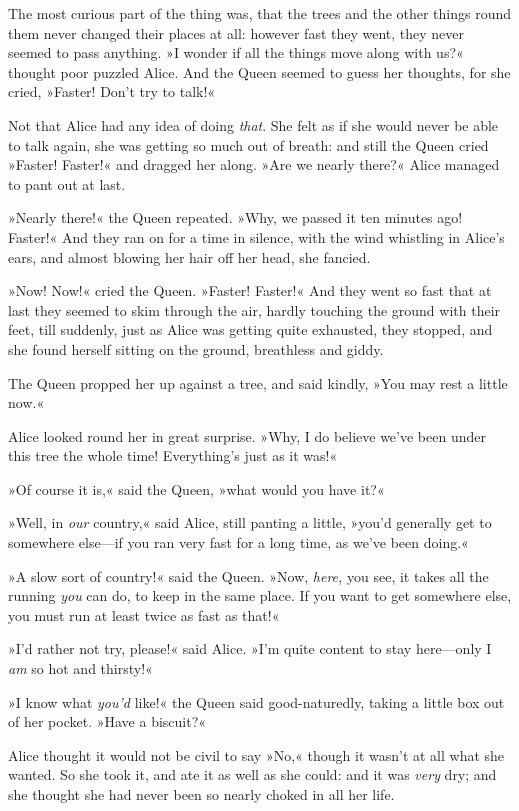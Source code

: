 The most curious part of the thing was, that the trees and the other things round them never changed their places at all: however fast they went, they never seemed to pass anything. »I wonder if all the things move along with us?« thought poor puzzled Alice. And the Queen seemed to guess her thoughts, for she cried, »Faster! Don't try to talk!«

Not that Alice had any idea of doing \textit{that}. She felt as if she would never be able to talk again, she was getting so much out of breath: and still the Queen cried »Faster! Faster!« and dragged her along. »Are we nearly there?« Alice managed to pant out at last.

»Nearly there!« the Queen repeated. »Why, we passed it ten minutes ago! Faster!« And they ran on for a time in silence, with the wind whistling in Alice's ears, and almost blowing her hair off her head, she fancied.

»Now! Now!« cried the Queen. »Faster! Faster!« And they went so fast that at last they seemed to skim through the air, hardly touching the ground with their feet, till suddenly, just as Alice was getting quite exhausted, they stopped, and she found herself sitting on the ground, breathless and giddy.

\label{black1}
The Queen propped her up against a tree, and said kindly, »You may rest a little now.«

Alice looked round her in great surprise. »Why, I do believe we've been under this tree the whole time! Everything's just as it was!«

»Of course it is,« said the Queen, »what would you have it?«

»Well, in \textit{our} country,« said Alice, still panting a little, »you'd generally get to somewhere else—if you ran very fast for a long time, as we've been doing.«

»A slow sort of country!« said the Queen. »Now, \textit{here,} you see, it takes all the running \textit{you} can do, to keep in the same place. If you want to get somewhere else, you must run at least twice as fast as that!«

»I'd rather not try, please!« said Alice. »I'm quite content to stay here—only I \textit{am} so hot and thirsty!«

»I know what \textit{you'd} like!« the Queen said good-naturedly, taking a little box out of her pocket. »Have a biscuit?«

Alice thought it would not be civil to say »No,« though it wasn't at all what she wanted. So she took it, and ate it as well as she could: and it was \textit{very} dry; and she thought she had never been so nearly choked in all her life.

